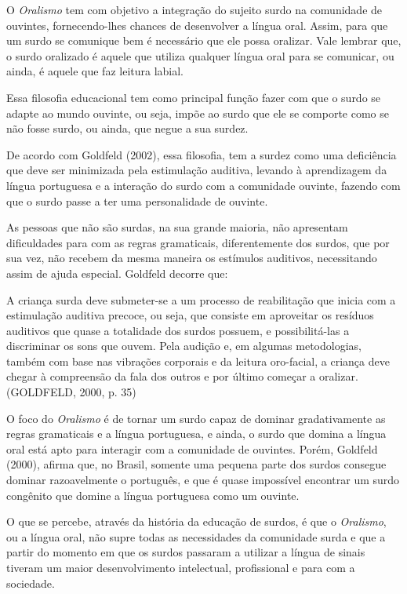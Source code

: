 \documentclass[brasil]{abnt}
\begin{document}
		 O \textit{Oralismo} tem com objetivo a integração do sujeito surdo na comunidade de ouvintes, fornecendo-lhes chances de desenvolver a língua oral. Assim, para que um surdo se comunique bem é 
		 necessário que ele possa oralizar. Vale lembrar que, o surdo oralizado é aquele que utiliza qualquer língua oral para se comunicar, ou ainda, é aquele que faz leitura labial.
		 
		 Essa filosofia educacional tem como principal função fazer com que o surdo se adapte ao mundo ouvinte, ou seja, impõe ao surdo que ele se comporte como se não fosse surdo, ou ainda, que negue a 
		 sua surdez.
		 
		 De acordo com Goldfeld (2002), essa filosofia, tem a surdez como uma deficiência que deve ser minimizada pela estimulação auditiva, levando à aprendizagem da língua portuguesa e a interação do surdo 
		 com a comunidade ouvinte, fazendo com que o surdo passe a ter uma personalidade de ouvinte.  
		 
		 As pessoas que não são surdas, na sua grande maioria, não apresentam dificuldades para com as regras gramaticais, diferentemente dos surdos, que por sua vez, não recebem da mesma maneira os estímulos 
		 auditivos, necessitando assim de ajuda especial. Goldfeld decorre que:
		 
			\begin{citacao} A criança surda deve submeter-se a um processo de reabilitação que inicia com a estimulação auditiva precoce, ou seja, que consiste em aproveitar os resíduos auditivos que quase a 
							totalidade dos surdos possuem, e possibilitá-las a discriminar os sons que ouvem. Pela audição e, em algumas metodologias, também com base nas vibrações corporais e da leitura 
							oro-facial, a criança deve chegar à compreensão da fala dos outros e por último começar a oralizar. (GOLDFELD, 2000, p. 35) 
			\end{citacao}
		
		O foco do \textit{Oralismo} é de tornar um surdo capaz de dominar gradativamente as regras gramaticais e a língua portuguesa, e ainda, o surdo que domina a língua oral está apto para interagir com 
		a comunidade de ouvintes. Porém, Goldfeld (2000), afirma que, no Brasil, somente uma pequena parte dos surdos consegue dominar razoavelmente o português, e que é quase impossível encontrar um surdo 
		congênito que domine a língua portuguesa como um ouvinte.
		
		O que se percebe, através da história da educação de surdos, é que o \textit{Oralismo}, ou a língua oral, não supre todas as necessidades da comunidade surda e que a partir do momento em que os surdos 
		passaram a utilizar a língua de sinais tiveram um maior desenvolvimento intelectual, profissional e para com a sociedade.		 		 
		 
\end{document}
